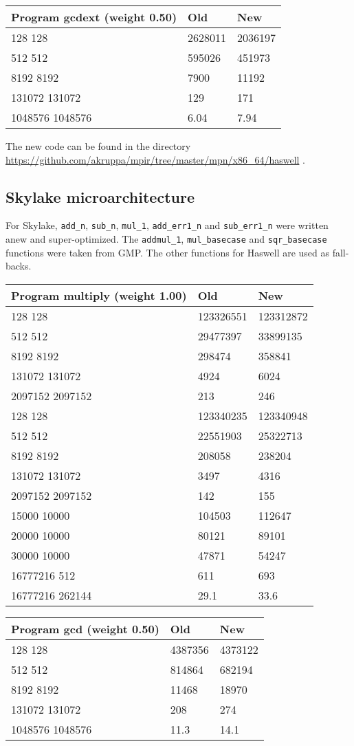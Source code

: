 \begin{longtable}[c]{@{}lll@{}}
\toprule
Program gcdext (weight 0.50) & Old & New\tabularnewline
\midrule
\endhead
128 128 & 2628011 & 2036197\tabularnewline
512 512 & 595026 & 451973\tabularnewline
8192 8192 & 7900 & 11192\tabularnewline
131072 131072 & 129 & 171\tabularnewline
1048576 1048576 & 6.04 & 7.94\tabularnewline
\bottomrule
\end{longtable}

The new code can be found in the directory
\url{https://github.com/akruppa/mpir/tree/master/mpn/x86_64/haswell} .

\subsection{Skylake microarchitecture}\label{skylake-microarchitecture}

For Skylake, \texttt{add\_n}, \texttt{sub\_n}, \texttt{mul\_1},
\texttt{add\_err1\_n} and \texttt{sub\_err1\_n} were written anew and
super-optimized. The \texttt{addmul\_1}, \texttt{mul\_basecase} and
\texttt{sqr\_basecase} functions were taken from GMP. The other
functions for Haswell are used as fall-backs.

\begin{longtable}[c]{@{}lll@{}}
\toprule
Program multiply (weight 1.00) & Old & New\tabularnewline
\midrule
\endhead
128 128 & 123326551 & 123312872\tabularnewline
512 512 & 29477397 & 33899135\tabularnewline
8192 8192 & 298474 & 358841\tabularnewline
131072 131072 & 4924 & 6024\tabularnewline
2097152 2097152 & 213 & 246\tabularnewline
128 128 & 123340235 & 123340948\tabularnewline
512 512 & 22551903 & 25322713\tabularnewline
8192 8192 & 208058 & 238204\tabularnewline
131072 131072 & 3497 & 4316\tabularnewline
2097152 2097152 & 142 & 155\tabularnewline
15000 10000 & 104503 & 112647\tabularnewline
20000 10000 & 80121 & 89101\tabularnewline
30000 10000 & 47871 & 54247\tabularnewline
16777216 512 & 611 & 693\tabularnewline
16777216 262144 & 29.1 & 33.6\tabularnewline
\bottomrule
\end{longtable}

\begin{longtable}[c]{@{}lll@{}}
\toprule
Program gcd (weight 0.50) & Old & New\tabularnewline
\midrule
\endhead
128 128 & 4387356 & 4373122\tabularnewline
512 512 & 814864 & 682194\tabularnewline
8192 8192 & 11468 & 18970\tabularnewline
131072 131072 & 208 & 274\tabularnewline
1048576 1048576 & 11.3 & 14.1\tabularnewline
\bottomrule
\end{longtable}

